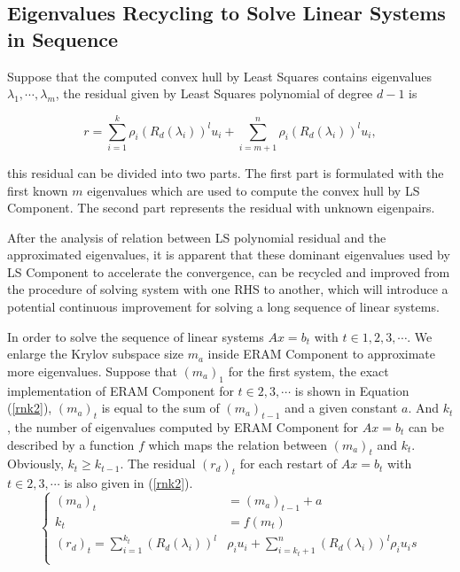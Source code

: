 \subsection {Eigenvalues Recycling to Solve Linear Systems in Sequence}

Suppose that the computed convex hull by Least Squares contains eigenvalues $\lambda_1,\cdots, \lambda_m$, the residual given by Least Squares polynomial of degree $d-1$ is

\begin{equation}
\label{rnk3}
r = \sum_{i=1}^{k}\rho_i (R_d(\lambda_i))^l u_i + \sum_{i=m+1}^{n}\rho_i (R_d(\lambda_i))^l u_i,
\end{equation}

this residual can be divided into two parts. The first part is formulated with the first known $m$ eigenvalues which are used to compute the convex hull by LS Component. The second part represents the residual with unknown eigenpairs.

After the analysis of relation between LS polynomial residual and the approximated eigenvalues, it is apparent that these dominant eigenvalues used by LS Component to accelerate the convergence, can be recycled and improved from the procedure of solving system with one RHS to another, which will introduce a potential continuous improvement for solving a long sequence of linear systems.

In order to solve the sequence of linear systems $Ax= b_t$ with $t \in 1,2,3, \cdots$. We enlarge the Krylov subspace size $m_a$ inside ERAM Component to approximate more eigenvalues. Suppose that $(m_a)_1$ for the first system, the exact implementation of ERAM Component for $t \in 2,3, \cdots$ is shown in Equation (\ref{rnk2}), $(m_a)_t$ is equal to the sum of $(m_a)_{t-1}$ and a given constant $a$. And $k_t$, the number of eigenvalues computed by ERAM Component for $Ax=b_t$ can be described by a function $f$ which maps the relation between $(m_a)_t$ and $k_t$. Obviously, $k_t \geq k_{t-1}$. The residual $(r_d)_t$ for each restart of $Ax=b_t$ with $t \in 2,3, \cdots$ is also given in (\ref{rnk2}).
\begin{equation}
\label{rnk2} \left \{
\begin{aligned}
(m_a)_t &=  (m_a)_{t-1}+a\\
k_t &= f(m_t) \\
(r_d)_t =\sum_{i=1}^{k_t}(R_d(\lambda_i))^l &\rho_i u_i + \sum_{i=k_t+1}^{n}(R_d(\lambda_i))^l \rho_i u_is \\
\end{aligned}
\right.
\end{equation}

